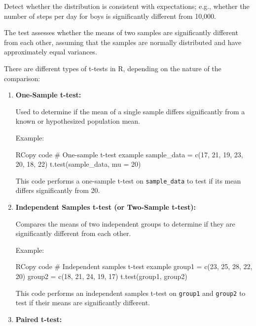 \documentclass[
]{article}
\newenvironment{Shaded}{}{}
\newcommand{\NormalTok}[1]{#1}
\begin{document}
Detect whether the distribution is consistent with expectations; e.g.,
whether the number of steps per day for boys is significantly different
from 10,000.

The test assesses whether the means of two samples are significantly
different from each other, assuming that the samples are normally
distributed and have approximately equal variances.

There are different types of t-tests in R, depending on the nature of
the comparison:

\begin{enumerate}
\def\labelenumi{\arabic{enumi}.}
\item
  \textbf{One-Sample t-test:}

  Used to determine if the mean of a single sample differs significantly
  from a known or hypothesized population mean.

  Example:

\begin{Shaded}
\begin{Highlighting}[]
\NormalTok{RCopy code}
\NormalTok{\# One{-}sample t{-}test example}
\NormalTok{sample\_data = c(17, 21, 19, 23, 20, 18, 22)}
\NormalTok{t.test(sample\_data, mu = 20)}
\end{Highlighting}
\end{Shaded}

  This code performs a one-sample t-test on \texttt{sample\_data} to
  test if its mean differs significantly from 20.
\item
  \textbf{Independent Samples t-test (or Two-Sample t-test):}

  Compares the means of two independent groups to determine if they are
  significantly different from each other.

  Example:

\begin{Shaded}
\begin{Highlighting}[]
\NormalTok{RCopy code}
\NormalTok{\# Independent samples t{-}test example}
\NormalTok{group1 = c(23, 25, 28, 22, 20)}
\NormalTok{group2 = c(18, 21, 24, 19, 17)}
\NormalTok{t.test(group1, group2)}
\end{Highlighting}
\end{Shaded}

  This code performs an independent samples t-test on \texttt{group1}
  and \texttt{group2} to test if their means are significantly
  different.
\item
  \textbf{Paired t-test:}


\end{enumerate}
\end{document}
